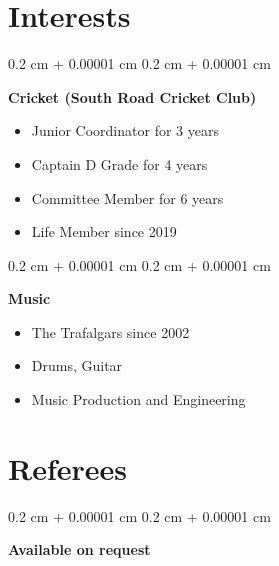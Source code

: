 \documentclass[12pt, a4paper]{article}
\newenvironment{highlights}{
    \begin{itemize}[
        topsep=0.10 cm,
        parsep=0.10 cm,
        partopsep=0pt,
        itemsep=0pt,
        leftmargin=0.4 cm + 10pt
    ]
}{
    \end{itemize}
} %
\newenvironment{onecolentry}{
    \begin{adjustwidth}{
        0.2 cm + 0.00001 cm
    }{
        0.2 cm + 0.00001 cm
    }
}{
    \end{adjustwidth}
} %
\begin{document}
    
    \section{Interests}



        
        \begin{onecolentry}
            \textbf{Cricket (South Road Cricket Club)}
            \begin{highlights}
                \item Junior Coordinator for 3 years
                \item Captain D Grade for 4 years
                \item Committee Member for 6 years
                \item Life Member since 2019
            \end{highlights}
        \end{onecolentry}


        \vspace{0.2 cm}

        \begin{onecolentry}
            \textbf{Music}
            \begin{highlights}
                \item The Trafalgars since 2002
                \item Drums, Guitar
                \item Music Production and Engineering
            \end{highlights}
        \end{onecolentry}



    
    \section{Referees}



        
        \begin{onecolentry}
            \textbf{Available on request}
        \end{onecolentry}



    
\end{document}
